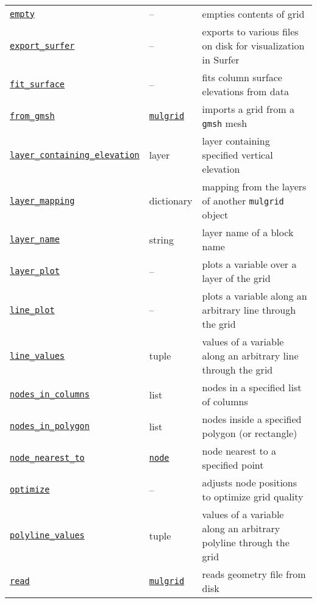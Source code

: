 \begin{center}
\begin{longtable}{|l|l|p{70mm}|}
  \hyperref[sec:mulgrid:empty]{\texttt{empty}} & --  & empties contents of grid\\
  \hyperref[sec:mulgrid:export_surfer]{\texttt{export\_surfer}} & -- & exports to various files on disk for visualization in Surfer\\ 
  \hyperref[sec:mulgrid:fit_surface]{\texttt{fit\_surface}} & -- & fits column surface elevations from data\\ 
  \hyperref[sec:mulgrid:from_gmsh]{\texttt{from\_gmsh}} & \hyperref[mulgrids]{\texttt{mulgrid}} & imports a grid from a \texttt{gmsh} mesh\\ 
  \hyperref[sec:mulgrid:layer_containing_elevation]{\texttt{layer\_containing\_elevation}} & layer & layer containing specified vertical elevation\\
  \hyperref[sec:mulgrid:layer_mapping]{\texttt{layer\_mapping}} & dictionary & mapping from the layers of another \texttt{mulgrid} object\\
  \hyperref[sec:mulgrid:layer_name]{\texttt{layer\_name}} & string & layer name of a block name\\ 
  \hyperref[sec:mulgrid:layer_plot]{\texttt{layer\_plot}} & -- & plots a variable over a layer of the grid\\
  \hyperref[sec:mulgrid:line_plot]{\texttt{line\_plot}} & -- & plots a variable along an arbitrary line through the grid\\
  \hyperref[sec:mulgrid:line_values]{\texttt{line\_values}} & tuple & values of a variable along an arbitrary line through the grid\\
  \hyperref[sec:mulgrid:nodes_in_columns]{\texttt{nodes\_in\_columns}} & list & nodes in a specified list of columns\\ 
  \hyperref[sec:mulgrid:nodes_in_polygon]{\texttt{nodes\_in\_polygon}} & list & nodes inside a specified polygon (or rectangle)\\ 
  \hyperref[sec:mulgrid:node_nearest_to]{\texttt{node\_nearest\_to}} & \hyperref[nodeobjects]{\texttt{node}} & node nearest to a specified point\\ 
  \hyperref[sec:mulgrid:optimize]{\texttt{optimize}} & -- & adjusts node positions to optimize grid quality\\
  \hyperref[sec:mulgrid:polyline_values]{\texttt{polyline\_values}} & tuple & values of a variable along an arbitrary polyline through the grid\\
  \hyperref[sec:mulgrid:read]{\texttt{read}} & \hyperref[mulgrids]{\texttt{mulgrid}} & reads geometry file from disk\\

\end{longtable}
\end{center}
